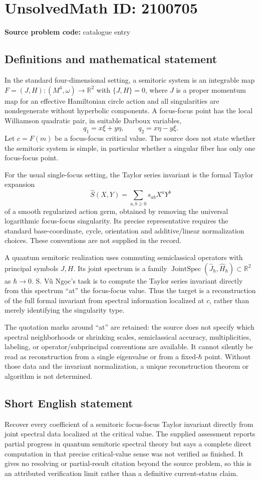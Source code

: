 \documentclass[11pt]{article}
\newcommand{\R}{\mathbb{R}}
\begin{document}
\section*{UnsolvedMath ID: 2100705}
\textbf{Source problem code:} catalogue entry
\subsection{Definitions and mathematical statement}
In the standard four-dimensional setting, a semitoric system is an integrable map $F=(J,H):(M^4,\omega)\to\R^2$ with $\{J,H\}=0$, where $J$ is a proper momentum map for an effective Hamiltonian circle action and all singularities are nondegenerate without hyperbolic components. A focus-focus point has the local Williamson quadratic pair, in suitable Darboux variables,
\[
 q_1=x\xi+y\eta,\qquad q_2=x\eta-y\xi.
\]
Let $c=F(m)$ be a focus-focus critical value. The source does not state whether the semitoric system is simple, in particular whether a singular fiber has only one focus-focus point.

For the usual single-focus setting, the Taylor series invariant is the formal Taylor expansion
\[
 \widehat S(X,Y)=\sum_{a,b\geq0}s_{ab}X^aY^b
\]
of a smooth regularized action germ, obtained by removing the universal logarithmic focus-focus singularity. Its precise representative requires the standard base-coordinate, cycle, orientation and additive/linear normalization choices. These conventions are not supplied in the record.

A quantum semitoric realization uses commuting semiclassical operators with principal symbols $J,H$. Its joint spectrum is a family $\operatorname{JointSpec}(\widehat J_\hbar,\widehat H_\hbar)\subset\R^2$ as $\hbar\to0$. S. Vũ Ngọc's task is to compute the Taylor series invariant directly from this spectrum ``at'' the focus-focus value. Thus the target is a reconstruction of the full formal invariant from spectral information localized at $c$, rather than merely identifying the singularity type.

The quotation marks around ``at'' are retained: the source does not specify which spectral neighborhoods or shrinking scales, semiclassical accuracy, multiplicities, labeling, or operator/subprincipal conventions are available. It cannot silently be read as reconstruction from a single eigenvalue or from a fixed-$\hbar$ point. Without those data and the invariant normalization, a unique reconstruction theorem or algorithm is not determined.
\subsection{Short English statement}
Recover every coefficient of a semitoric focus-focus Taylor invariant directly from joint spectral data localized at the critical value. The supplied assessment reports partial progress in quantum semitoric spectral theory but says a complete direct computation in that precise critical-value sense was not verified as finished. It gives no resolving or partial-result citation beyond the source problem, so this is an attributed verification limit rather than a definitive current-status claim.
\end{document}
